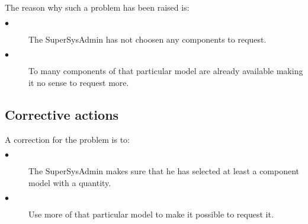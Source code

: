 The reason why such a problem has been raised is:\\
\begin{description}
\item[$\bullet$] The SuperSysAdmin has not choosen any components to request.
\item[$\bullet$] To many components of that particular model are already
available making it no sense to request more.
\end{description}


\subsection{Corrective actions}

A correction for the problem is to:\\
\begin{description}
\item[$\bullet$] The SuperSysAdmin makes sure that he has selected at least a
component model with a quantity.
\item[$\bullet$] Use more of that particular model to make it possible to
request it.
\end{description}
